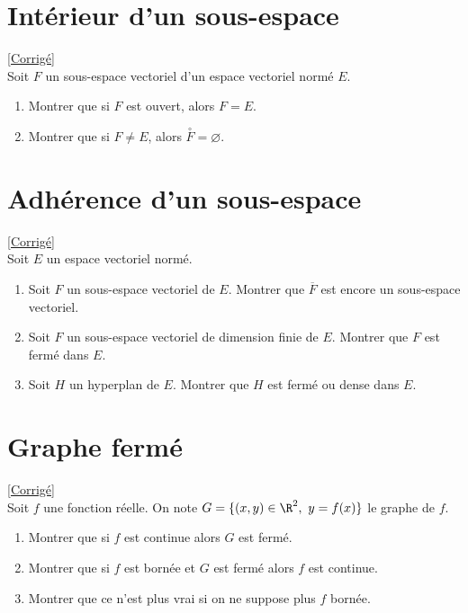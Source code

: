 \documentclass{book}
\begin{document}
\section{Intérieur d'un sous-espace }
\label{Intérieur d'un sev}
\textcolor{blue}{\hyperref[sec:interieur-dun-sev]{[Corrigé]}}\\
Soit $F$ un sous-espace vectoriel d'un espace vectoriel normé $E$.
\begin{enumerate}
	\item Montrer que si $F$ est ouvert, alors $F=E$.
	\item Montrer que si $F\ne E$, alors $\overset{\circ}{F}=\varnothing$.
\end{enumerate}

\section{Adhérence d'un sous-espace }
\label{Adhérence d'un sev}
\textcolor{blue}{\hyperref[sec:adherence-dun-sev]{[Corrigé]}}\\
Soit $E$ un espace vectoriel normé.
\begin{enumerate}
	\item Soit $F$ un sous-espace vectoriel de $E$. Montrer que $\overline F$ est encore un sous-espace vectoriel.
	\item Soit $F$ un sous-espace vectoriel de dimension finie de $E$. Montrer que $F$ est fermé dans $E$.
	\item Soit $H$ un hyperplan de $E$. Montrer que $H$ est fermé ou dense dans $E$.
\end{enumerate}

\section{Graphe fermé }
\label{Graphe fermé}
\textcolor{blue}{\hyperref[sec:graphe-ferme]{[Corrigé]}}\\
Soit $f$ une fonction réelle. On note $G=\{(x,y)\in \R^2,\ y=f(x)\}$ le graphe de $f$.
\begin{enumerate}
	\item Montrer que si $f$ est continue alors $G$ est fermé.
	\item Montrer que si $f$ est bornée et $G$ est fermé alors $f$ est continue.
	\item Montrer que ce n'est plus vrai si on ne suppose plus $f$ bornée.
\end{enumerate}
\end{document}
